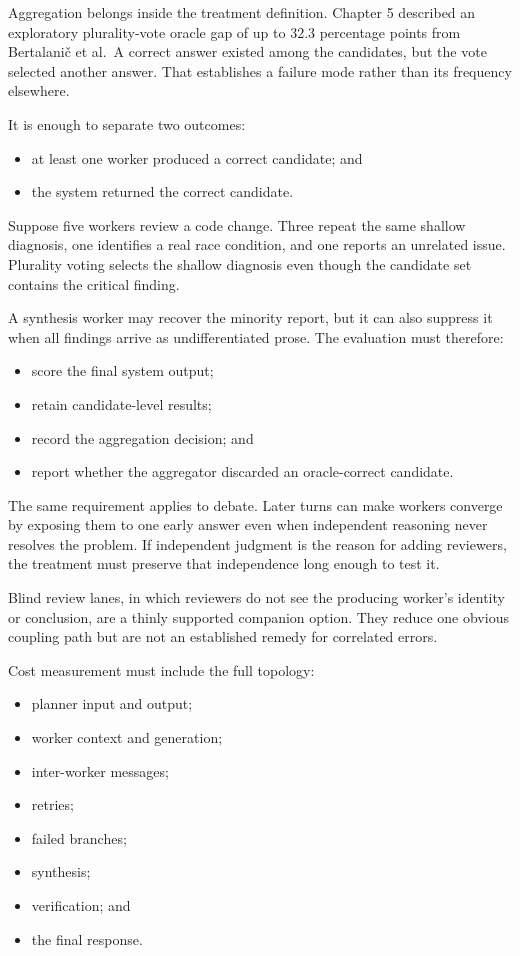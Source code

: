 Aggregation belongs inside the treatment definition. Chapter 5 described an exploratory plurality-vote oracle gap of up to 32.3 percentage points from Bertalani\v{c} et al.~A correct answer existed among the candidates, but the vote selected another answer. That establishes a failure mode rather than its frequency elsewhere.

It is enough to separate two outcomes:

\begin{itemize}
\tightlist
\item
  at least one worker produced a correct candidate; and
\item
  the system returned the correct candidate.
\end{itemize}

Suppose five workers review a code change. Three repeat the same shallow diagnosis, one identifies a real race condition, and one reports an unrelated issue. Plurality voting selects the shallow diagnosis even though the candidate set contains the critical finding.

A synthesis worker may recover the minority report, but it can also suppress it when all findings arrive as undifferentiated prose. The evaluation must therefore:

\begin{itemize}
\tightlist
\item
  score the final system output;
\item
  retain candidate-level results;
\item
  record the aggregation decision; and
\item
  report whether the aggregator discarded an oracle-correct candidate.
\end{itemize}

The same requirement applies to debate. Later turns can make workers converge by exposing them to one early answer even when independent reasoning never resolves the problem. If independent judgment is the reason for adding reviewers, the treatment must preserve that independence long enough to test it.

Blind review lanes, in which reviewers do not see the producing worker's identity or conclusion, are a thinly supported companion option. They reduce one obvious coupling path but are not an established remedy for correlated errors.

Cost measurement must include the full topology:

\begin{itemize}
\tightlist
\item
  planner input and output;
\item
  worker context and generation;
\item
  inter-worker messages;
\item
  retries;
\item
  failed branches;
\item
  synthesis;
\item
  verification; and
\item
  the final response.
\end{itemize}

